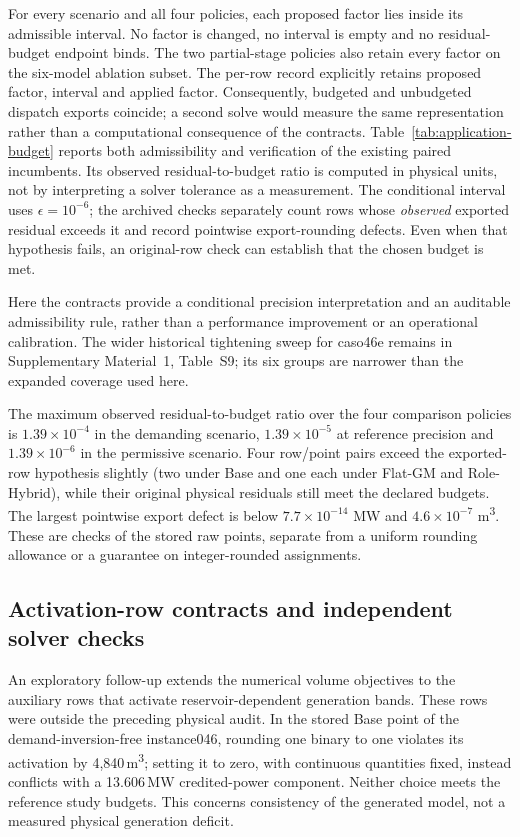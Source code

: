 \documentclass[11pt]{article}
\theoremstyle{definition}
\theoremstyle{remark}
\begin{document}
For every scenario and all four policies, each proposed factor lies inside its admissible
interval. No factor is changed, no interval is empty and no residual-budget endpoint binds.
The two partial-stage policies also retain every factor on the six-model ablation subset.
The per-row record explicitly retains proposed factor, interval and applied factor.
Consequently, budgeted and unbudgeted dispatch exports coincide; a second solve would
measure the same representation rather than a computational consequence of the contracts.
Table~\ref{tab:application-budget} reports both admissibility and verification of the
existing paired incumbents. Its observed residual-to-budget ratio is computed in physical
units, not by interpreting a solver tolerance as a measurement. The conditional interval
uses $\epsilon=10^{-6}$; the archived checks separately count rows whose \emph{observed}
exported residual exceeds it and record pointwise export-rounding defects. Even when
that hypothesis fails, an original-row check can establish that the chosen budget is met.

Here the contracts provide a conditional precision interpretation and an auditable
admissibility rule, rather than a performance improvement or an operational calibration.
The wider historical tightening sweep for caso46e remains in Supplementary Material~1,
Table~S9; its six groups are narrower than the expanded coverage used here.



The maximum observed residual-to-budget ratio over the four comparison policies is
$1.39\times10^{-4}$ in the demanding scenario, $1.39\times10^{-5}$ at reference
precision and $1.39\times10^{-6}$ in the permissive scenario. Four row/point pairs
exceed the exported-row hypothesis slightly (two under Base and one each under Flat-GM
and Role-Hybrid), while their original physical residuals still meet the declared budgets.
The largest pointwise export defect is below $7.7\times10^{-14}$ MW and
$4.6\times10^{-7}$ m\textsuperscript{3}. These are checks of the stored raw points,
separate from a uniform rounding allowance or a guarantee on integer-rounded assignments.

\subsection{Activation-row contracts and independent solver checks}
\label{subsec:results-activation}
An exploratory follow-up extends the numerical volume objectives to the auxiliary rows
that activate reservoir-dependent generation bands. These rows were outside the preceding
physical audit. In the stored Base point of the demand-inversion-free instance046, rounding
one binary to one violates its activation by 4,840\,m\textsuperscript{3}; setting it to zero,
with continuous quantities fixed, instead conflicts with a 13.606\,MW credited-power
component. Neither choice meets the reference study budgets. This concerns consistency
of the generated model, not a measured physical generation deficit.
\end{document}
